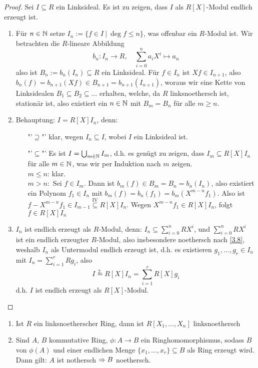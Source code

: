\begin{proof}
	Sei $I\subseteq R$ ein Linksideal. Es ist zu zeigen, dass $I$ als $R[X]$-Modul endlich erzeugt ist.
	\begin{enumerate}
		\item Für $n\in \mathbb{N}$ setze $I_n:= \{f\in I \ | \ \deg f \leq n\}$, was offenbar ein $R$-Modul ist. Wir betrachten die $R$-lineare Abbildung 
		$$b_n : I_n \longrightarrow R, \quad \sum_{i=0}^n a_i X^i \mapsto a_n$$
		also ist $B_n:= b_n(I_n) \subseteq R$ ein Linksideal. Für $f\in I_n$ ist $Xf\in I_{n+1}$, also $b_n(f) = b_{n+1}(Xf) \in B_{n+1} = b_{n+1}(I_{n+1})$, woraus wir eine Kette von Linksidealen $B_1 \subseteq B_2 \subseteq \ldots$ erhalten, welche, da $R$ linksnoethersch ist, stationär ist, also existiert ein $n\in \mathbb{N}$ mit $B_m = B_n$ für alle $m\geq n$.
		\item Behauptung: $I = R[X] I_n$, denn: 
		\begin{enumerate}
			\item["'$\supseteq$"']  klar, wegen $I_n\subseteq I$, wobei $I$ ein Linksideal ist.
			\item["'$\subseteq$"'] Es ist $I = \bigcup_{m\in \mathbb{N}} I_m$, d.h. es genügt zu zeigen, dass $I_m \subseteq R[X] I_n$ für alle $m\in \mathbb{N}$, was wir per Induktion nach $m$ zeigen. \\
			$m\leq n$: klar.\\
			$m >n:$ Sei $f\in I_m$. Dann ist $b_m(f) \in B_m  = B_n = b_n(I_n)$, also existiert ein Polynom $f_1\in I_n$ mit $b_m(f) = b_n(f_1)= b_m(X^{m-n}f_1)$. Also ist $f- X^{m-n} f_1 \in I_{m-1} \overset{\text{IV}}{\subseteq } R[X] I_n$. Wegen $X^{m-n} f_1 \in R[X] I_n$, folgt $f\in R[X] I_n$
		\end{enumerate}
	\item $I_n$ ist endlich erzeugt als $R$-Modul, denn: $I_n \subseteq \sum_{i=0}^n RX^i$, und $\sum_{i=0}^n RX^i$ ist ein endlich erzeugter $R$-Modul, also insbesondere noethersch nach \ref{3.8}, weshalb $I_n$ als Untermodul endlich erzeugt ist, d.h. es existieren $g_1, \ldots, g_r\in I_n $ mit $I_n = \sum_{i=1}^r Rg_i$, also 
	$$I \overset{2.}{=} R[X]I_n = \sum_{i=1}^r R[X] g_i $$
	d.h. $I$ ist endlich erzeugt als $R[X]$-Modul.
	\end{enumerate}
\end{proof}
\begin{fo}\label{2.13}
	\begin{enumerate}[label= \alph*)]
		\item Ist $R$ ein linksnoetherscher Ring, dann ist $R[X_1, \ldots, X_n]$ linksnoethersch
		\item Sind $A,\, B$ kommutative Ring, $\phi:A \to B$ ein Ringhomomorphismus, sodass $B$ von $\phi(A)$ und einer endlichen Menge $\{x_1, \ldots, x_r\}\subseteq B$ als Ring erzeugt wird. Dann gilt: $A$ ist nothersch $\Rightarrow B$ noethersch.
	\end{enumerate}
\end{fo}
